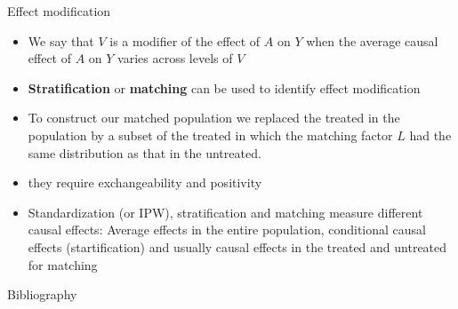 \documentclass{beamer}
\begin{document}
\begin{frame}{Effect modification}

  \begin{itemize}
    \item We say that $V$ is a modifier of the effect of $A$ on $Y$
      when the average causal effect of $A$ on $Y$ varies across levels of $V$
    \item \textbf{Stratification} or \textbf{matching} can be used to identify effect modification
    \item<2-> To construct our matched population we replaced the treated in the 
      population by a subset of the treated in which the matching factor $L$ had the
      same distribution as that in the untreated.
    \item<3-> they require exchangeability and positivity
    \item<4-> Standardization (or IPW), stratification and matching measure different
      causal effects: Average effects in the entire population, conditional causal effects (startification) and usually causal effects in the treated and untreated for matching
  \end{itemize}

\end{frame}



\begin{frame}[allowframebreaks]{Bibliography}
  \tiny

\end{frame}
\end{document}
